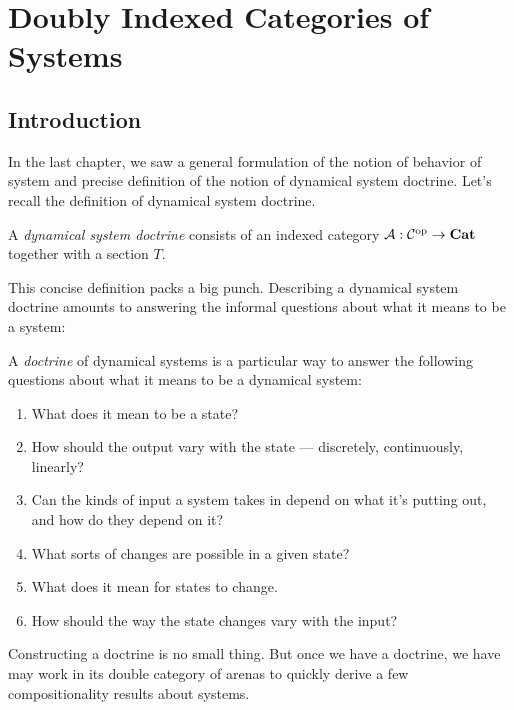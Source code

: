 \documentclass[DynamicalBook]{subfiles}
\begin{document}
%


\setcounter{chapter}{3}%


\chapter{Doubly Indexed Categories of Systems}

\section{Introduction}

In the last chapter, we saw a general formulation of the notion of behavior of
system and precise definition of the notion of dynamical system doctrine. Let's
recall the definition of dynamical system doctrine.

\begin{definition}\label{def.doctrine}
A \emph{dynamical system doctrine} consists of an indexed category $\mathcal{A} :
\mathcal{C}^{\textnormal{op}} \to \textbf{Cat}$ together with a section $T$.
\end{definition}

This concise definition packs a big punch. Describing a dynamical system
doctrine amounts to answering the informal questions about what it means to be a
system:
\begin{informal}
  A \emph{doctrine} of dynamical systems is a particular way to answer the following
  questions about what it means to be a dynamical system:
  \begin{enumerate}
  \item What does it mean to be a state?
  \item How should the output vary with the state --- discretely,
    continuously, linearly?
  \item Can the kinds of input a
    system takes in depend on what it's putting out, and how do they depend on it?
  \item What sorts of changes are possible in a given state?
  \item What does it mean for states to change. 
  \item How should the way the state changes vary with the input?
  \end{enumerate}
\end{informal}

Constructing a doctrine is no small thing. But once we have a doctrine, we have
may work in its double category of arenas to quickly derive a few
compositionality results about systems.
\end{document}
